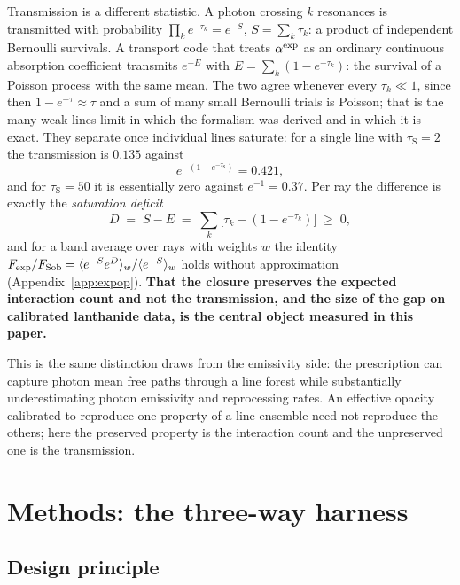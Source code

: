 \documentclass[fleqn,usenatbib]{mnras}
\newcommand{\taus}{\tau_{\mathrm{S}}}
\begin{document}
Transmission is a different statistic. A photon crossing $k$ resonances is
transmitted with probability $\prod_k e^{-\tau_k} = e^{-S}$, $S=\sum_k\tau_k$:
a product of independent Bernoulli survivals. A transport code that treats
$\alpha^{\rm exp}$ as an ordinary continuous absorption coefficient transmits
$e^{-E}$ with $E=\sum_k(1-e^{-\tau_k})$: the survival of a Poisson process with
the same mean. The two agree whenever every $\tau_k\ll1$, since then
$1-e^{-\tau}\approx\tau$ and a sum of many small Bernoulli trials is Poisson;
that is the many-weak-lines limit in which the formalism was derived and in
which it is exact. They separate once individual lines saturate: for a single
line with $\taus=2$ the transmission is $0.135$ against
\begin{equation}
  e^{-(1-e^{-\taus})} = 0.421,
  \label{eq:capped}
\end{equation}
and for $\taus=50$ it is essentially zero against $e^{-1}=0.37$. Per ray the
difference is exactly the \emph{saturation deficit}
\begin{equation}
  D \;=\; S - E \;=\; \sum_k\bigl[\tau_k - (1-e^{-\tau_k})\bigr] \;\ge\; 0,
  \label{eq:deficit}
\end{equation}
and for a band average over rays with weights $w$ the identity
$F_{\rm exp}/F_{\rm Sob} = \langle e^{-S}e^{D}\rangle_w/\langle e^{-S}\rangle_w$
holds without approximation (Appendix~\ref{app:expop}). \textbf{That the
closure preserves the expected interaction count and not the transmission,
and the size of the gap on calibrated lanthanide data, is the central object
measured in this paper.}

This is the same distinction \citet{morag2026} draws from the emissivity side:
the \citet{eastman1993} prescription can capture photon mean free paths
through a line forest while substantially underestimating photon emissivity
and reprocessing rates. An effective opacity calibrated to reproduce one
property of a line ensemble need not reproduce the others; here the preserved
property is the interaction count and the unpreserved one is the
transmission.

\section{Methods: the three-way harness}
\label{sec:methods}

\subsection{Design principle}
\end{document}
